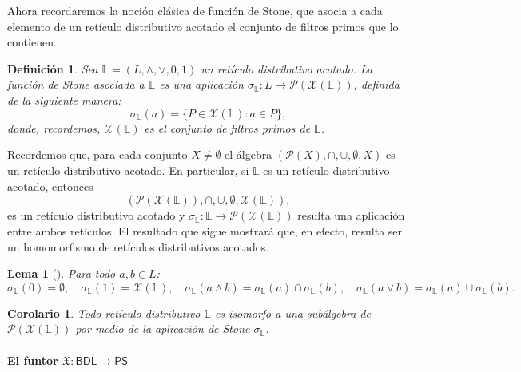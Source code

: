 \documentclass[12pt]{book}
\newtheorem{lemma}[theorem]{Lema}
\newtheorem{corollary}[theorem]{Corolario}
\newtheorem{definition}[theorem]{Definición}
\newcommand{\X}{\mathfrak{X}}
\begin{document}
\medskip

Ahora recordaremos la noción clásica de función de Stone, que asocia a cada elemento de un retículo distributivo acotado el conjunto de filtros 
primos que lo contienen. 

\begin{definition}\label{def:Stone-func}
Sea \( \mathbb{L}=(L,\wedge,\vee,0,1) \) un retículo distributivo acotado. La \emph{función de Stone} asociada a \( \mathbb{L} \) es una aplicación $\sigma_{\mathbb{L}}\colon L\to\mathcal{P}(\mathcal{X}(\mathbb{L}))$, definida de la siguiente manera:
\[\sigma_{\mathbb{L}}(a)=\{P\in \mathcal{X}(\mathbb{L}) : a\in P\}, \]
donde, recordemos, \( \mathcal{X}(\mathbb{L}) \) es el conjunto de filtros primos de \( \mathbb{L} \).
\end{definition}

Recordemos que, para cada conjunto $X \neq \emptyset$ el álgebra $\left(\mathcal{P}(X),\cap,\cup,\emptyset,X\right)$ es un retículo distributivo acotado. En particular, si $\mathbb{L}$ es un retículo distributivo acotado, entonces
\[ \left( \mathcal{P}(\mathcal{X}(\mathbb{L})),\cap,\cup,\emptyset,\mathcal{X}(\mathbb{L}) \right), \]
es un retículo distributivo acotado y $\sigma_{\mathbb{L}} \colon \mathbb{L} \to \mathcal{P}(\mathcal{X}(\mathbb{L}))$ resulta una aplicación entre ambos retículos. El resultado que sigue mostrará que, en efecto, resulta ser un homomorfismo de retículos distributivos acotados.

\begin{lemma}[{\cite[Lema~2.5.10]{SS}}]\label{lem:Stone_prop}
Para todo \( a,b\in L \):
\[
\sigma_{\mathbb{L}}(0)=\emptyset,\quad
\sigma_{\mathbb{L}}(1)=\mathcal{X}(\mathbb{L}),\quad
\sigma_{\mathbb{L}}(a\wedge b)=\sigma_{\mathbb{L}}(a)\cap\sigma_{\mathbb{L}}(b),\quad
\sigma_{\mathbb{L}}(a\vee b)=\sigma_{\mathbb{L}}(a)\cup\sigma_{\mathbb{L}}(b).
\]
\end{lemma}

\begin{corollary} Todo retículo distributivo $\mathbb{L}$ es isomorfo a una subálgebra de $\mathcal{P}(\mathcal{X}(\mathbb{L}))$ por medio de la aplicación de Stone $\sigma_{\mathbb{L}}$.
\end{corollary}

\paragraph{El funtor \(\X\colon \mathsf{BDL}\to\mathsf{PS}\)}\;

\medskip
\end{document}
